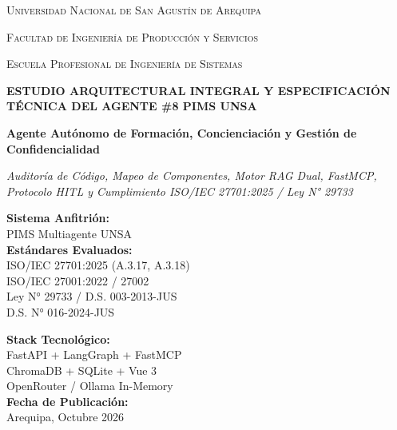 \documentclass[11pt,a4paper]{article}
\begin{document}
\begin{titlepage}
    \centering
    \vspace*{0.8cm}
    {\scshape\LARGE Universidad Nacional de San Agustín de Arequipa \par}
    \vspace{0.3cm}
    {\scshape\large Facultad de Ingeniería de Producción y Servicios \par}
    {\scshape\large Escuela Profesional de Ingeniería de Sistemas \par}
    \vspace{1.2cm}
    
    \begin{tcolorbox}[colback=unsaRed!10, colframe=unsaRed, arc=4mm]
        \centering
        \vspace{0.4cm}
        {\huge\bfseries\color{unsaRed} ESTUDIO ARQUITECTURAL INTEGRAL Y ESPECIFICACIÓN TÉCNICA DEL AGENTE \#8 PIMS UNSA \par}
        \vspace{0.3cm}
        {\Large\bfseries Agente Autónomo de Formación, Concienciación y Gestión de Confidencialidad \par}
        \vspace{0.2cm}
        {\normalsize\itshape Auditoría de Código, Mapeo de Componentes, Motor RAG Dual, FastMCP, Protocolo HITL y Cumplimiento ISO/IEC 27701:2025 / Ley N° 29733 \par}
        \vspace{0.4cm}
    \end{tcolorbox}

    \vspace{1.5cm}

    \begin{minipage}{0.48\textwidth}
        \begin{flushleft} \large
            \textbf{Sistema Anfitrión:}\\
            PIMS Multiagente UNSA\\
            \textbf{Estándares Evaluados:}\\
            ISO/IEC 27701:2025 (A.3.17, A.3.18)\\
            ISO/IEC 27001:2022 / 27002\\
            Ley N° 29733 / D.S. 003-2013-JUS\\
            D.S. N° 016-2024-JUS
        \end{flushleft}
    \end{minipage}
    \hfill
    \begin{minipage}{0.48\textwidth}
        \begin{flushright} \large
            \textbf{Stack Tecnológico:}\\
            FastAPI + LangGraph + FastMCP\\
            ChromaDB + SQLite + Vue 3\\
            OpenRouter / Ollama In-Memory\\
            \textbf{Fecha de Publicación:}\\
            Arequipa, Octubre 2026
        \end{flushright}
    \end{minipage}


\end{titlepage}
\end{document}
